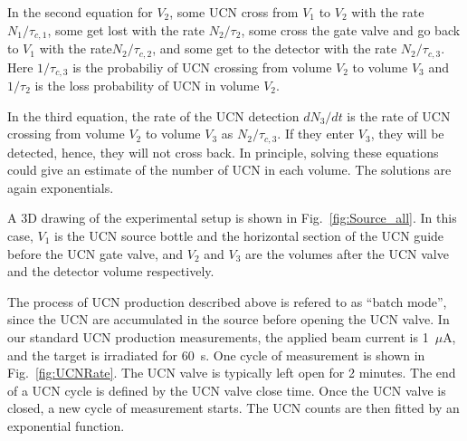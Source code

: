 In the second equation for $V_2$, some UCN cross from $V_1$ to $V_2$
with the rate $N_1/\tau_{c,1}$, some get lost with the rate
$N_2/\tau_2$, some cross the gate valve and go back to $V_1$ with the
rate$N_2/\tau_{c,2}$, and some get to the detector with the rate
$N_2/\tau_{c,3}$. Here $1/\tau_{c,3}$ is the probabiliy of UCN
crossing from volume $V_2$ to volume $V_3$ and $1/\tau_2$ is the loss
probability of UCN in volume $V_2$.



In the third equation, the rate of the UCN detection $dN_3/dt$ is the
rate of UCN crossing from volume $V_2$ to volume $V_3$ as
$N_2/\tau_{c,3}$. If they enter $V_3$, they will be detected, hence,
they will not cross back.  In principle, solving these equations could
give an estimate of the number of UCN in each volume. The solutions
are again exponentials.

A 3D drawing of the experimental setup is shown in
Fig.~\ref{fig:Source_all}. In this case, $V_1$ is the UCN source
bottle and the horizontal section of the UCN guide before the UCN gate
valve, and $V_2$ and $V_3$ are the volumes after the UCN valve and the
detector volume respectively.


The process of UCN production described above is refered to as ``batch
mode'', since the UCN are accumulated in the source before opening the
UCN valve.
In our standard UCN production measurements, the applied beam current
is 1~$\mu$A, and the target is irradiated for 60~s. One cycle of
measurement is shown in Fig.~\ref{fig:UCNRate}. The UCN valve is
typically left open for 2 minutes. The end of a UCN cycle is defined
by the UCN valve close time. Once the UCN valve is closed, a new cycle
of measurement starts. The UCN counts are then fitted by an
exponential function.


